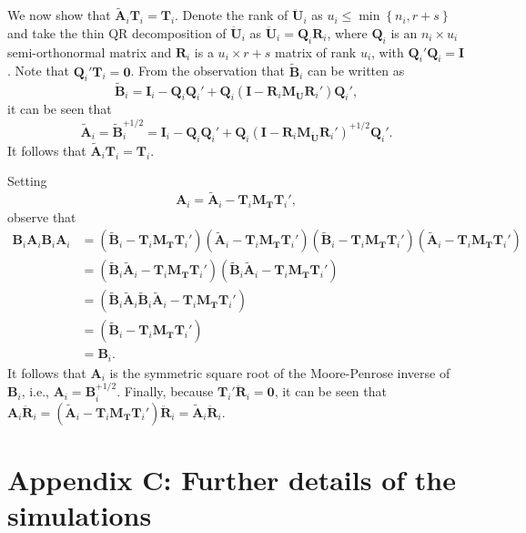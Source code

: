 \documentclass[12pt]{article}
\begin{document}
We now show that \(\tilde{\mathbf{A}}_i \mathbf{T}_i = \mathbf{T}_i\).
Denote the rank of \(\mathbf{\ddot{U}}_i\) as
\(u_i \leq \min \left\{n_i, r + s \right\}\) and take the thin QR
decomposition of \(\mathbf{\ddot{U}}_i\) as
\(\mathbf{\ddot{U}}_i = \mathbf{Q}_i \mathbf{R}_i\), where
\(\mathbf{Q}_i\) is an \(n_i \times u_i\) semi-orthonormal matrix and
\(\mathbf{R}_i\) is a \(u_i \times r + s\) matrix of rank \(u_i\), with
\(\mathbf{Q}_i'\mathbf{Q}_i = \mathbf{I}\). Note that
\(\mathbf{Q}_i'\mathbf{T}_i = \mathbf{0}\). From the observation that
\(\tilde{\mathbf{B}}_i\) can be written as \[
\tilde{\mathbf{B}}_i = \mathbf{I}_i - \mathbf{Q}_i \mathbf{Q}_i' + \mathbf{Q}_i \left(\mathbf{I} - \mathbf{R}_i \mathbf{M}_{\mathbf{\ddot{U}}} \mathbf{R}_i'\right)\mathbf{Q}_i',
\] it can be seen that \begin{equation}
\tilde{\mathbf{A}}_i = \tilde{\mathbf{B}}_i^{+1/2} = \mathbf{I}_i - \mathbf{Q}_i \mathbf{Q}_i' + \mathbf{Q}_i \left(\mathbf{I} - \mathbf{R}_i \mathbf{M}_{\mathbf{\ddot{U}}} \mathbf{R}_i'\right)^{+1/2} \mathbf{Q}_i'.
\end{equation} It follows that
\(\tilde{\mathbf{A}}_i \mathbf{T}_i = \mathbf{T}_i\).

Setting \begin{equation}
\mathbf{A}_i = \tilde{\mathbf{A}}_i - \mathbf{T}_i \mathbf{M_T}\mathbf{T}_i',
\end{equation} observe that \begin{align*}
\mathbf{B}_i \mathbf{A}_i \mathbf{B}_i \mathbf{A}_i &= \left(\tilde{\mathbf{B}}_i - \mathbf{T}_i \mathbf{M_T}\mathbf{T}_i'\right) \left(\tilde{\mathbf{A}}_i - \mathbf{T}_i \mathbf{M_T}\mathbf{T}_i'\right)\left(\tilde{\mathbf{B}}_i - \mathbf{T}_i \mathbf{M_T}\mathbf{T}_i'\right) \left(\tilde{\mathbf{A}}_i - \mathbf{T}_i \mathbf{M_T}\mathbf{T}_i'\right) \\
&= \left(\tilde{\mathbf{B}}_i\tilde{\mathbf{A}}_i - \mathbf{T}_i \mathbf{M_T}\mathbf{T}_i'\right)\left(\tilde{\mathbf{B}}_i\tilde{\mathbf{A}}_i - \mathbf{T}_i \mathbf{M_T}\mathbf{T}_i'\right) \\
&= \left(\tilde{\mathbf{B}}_i\tilde{\mathbf{A}}_i\tilde{\mathbf{B}}_i\tilde{\mathbf{A}}_i - \mathbf{T}_i \mathbf{M_T}\mathbf{T}_i'\right) \\
&= \left(\tilde{\mathbf{B}}_i - \mathbf{T}_i \mathbf{M_T}\mathbf{T}_i'\right) \\
&= \mathbf{B}_i.
\end{align*} It follows that \(\mathbf{A}_i\) is the symmetric square
root of the Moore-Penrose inverse of \(\mathbf{B}_i\), i.e.,
\(\mathbf{A}_i = \mathbf{B}_i^{+1/2}\). Finally, because
\(\mathbf{T}_i ' \mathbf{\ddot{R}}_i= \mathbf{0}\), it can be seen that
\(\mathbf{A}_i \mathbf{\ddot{R}}_i = \left(\tilde{\mathbf{A}}_i - \mathbf{T}_i \mathbf{M_T}\mathbf{T}_i'\right)\mathbf{\ddot{R}}_i = \tilde{\mathbf{A}}_i \mathbf{\ddot{R}}_i\).

\hypertarget{appendix-c-further-details-of-the-simulations}{%
\section{Appendix C: Further details of the
simulations}\label{appendix-c-further-details-of-the-simulations}}



\end{document}
